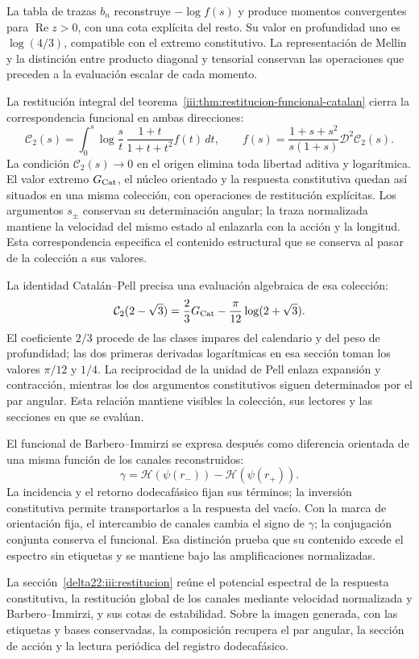 La tabla de trazas $b_n$ reconstruye $-\log f(s)$ y produce momentos
convergentes para $\operatorname{Re}z>0$, con una cota explícita del
resto. Su valor en profundidad uno es $\log(4/3)$, compatible con
el extremo constitutivo. La representación de Mellin y la distinción
entre producto diagonal y tensorial conservan las operaciones que
preceden a la evaluación escalar de cada momento.

La restitución integral del
teorema~\ref{iii:thm:restitucion-funcional-catalan} cierra la
correspondencia funcional en ambas direcciones:
\[
 \mathcal C_2(s)=\int_0^s\log\frac{s}{t}\,
       \frac{1+t}{1+t+t^2}f(t)\,dt,\qquad
 f(s)=\frac{1+s+s^2}{s(1+s)}\mathcal D^2\mathcal C_2(s).
\]
La condición $\mathcal C_2(s)\to0$ en el origen elimina toda
libertad aditiva y logarítmica. El valor extremo $G_{\rm Cat}$,
el núcleo orientado y la respuesta constitutiva quedan así situados
en una misma colección, con operaciones de restitución explícitas.
Los argumentos $s_\pm$ conservan su determinación angular; la traza
normalizada mantiene la velocidad del mismo estado al enlazarla
con la acción y la longitud. Esta correspondencia especifica el
contenido estructural que se conserva al pasar de la colección a sus valores.

La identidad Catalán--Pell precisa una evaluación algebraica de esa
colección:
\[
\mathcal C_2(2-\sqrt3)
=\frac23G_{\rm Cat}-\frac{\pi}{12}\log(2+\sqrt3).
\]
El coeficiente $2/3$ procede de las clases impares del calendario y
del peso de profundidad; las dos primeras derivadas logarítmicas en esa sección toman los valores
$\pi/12$ y $1/4$. La reciprocidad de la unidad de Pell enlaza
expansión y contracción, mientras los dos argumentos constitutivos
siguen determinados por el par angular. Esta relación mantiene
visibles la colección, sus lectores y las secciones en que se evalúan.

El funcional de Barbero--Immirzi se expresa después como diferencia
orientada de una misma función de los canales reconstruidos:
\[
\gamma=\mathcal H(\psi(r_-))-\mathcal H(\psi(r_+)).
\]
La incidencia y el retorno dodecafásico fijan sus términos; la
inversión constitutiva permite transportarlos a la respuesta del
vacío. Con la marca de orientación fija, el intercambio de canales
cambia el signo de $\gamma$; la conjugación conjunta conserva el
funcional. Esa distinción prueba que su contenido excede el espectro
sin etiquetas y se mantiene bajo las amplificaciones normalizadas.

\par
La sección~\ref{delta22:iii:restitucion} reúne el potencial espectral de la respuesta constitutiva, la restitución global de los canales mediante velocidad normalizada y Barbero--Immirzi, y sus cotas de estabilidad. Sobre la imagen generada, con las etiquetas y bases conservadas, la composición recupera el par angular, la sección de acción y la lectura periódica del registro dodecafásico.

